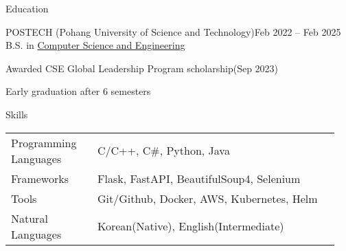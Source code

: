 \documentclass{resume}
\begin{document}
\begin{rSection}{Education}
    \begin{rSubsection}{POSTECH (Pohang University of Science and Technology)}{Feb 2022 -- Feb 2025}
        B.S. in \href{https://cse.postech.ac.kr}{Computer Science and Engineering}

        \item Awarded CSE Global Leadership Program scholarship(Sep 2023)

        \item Early graduation after 6 semesters
    \end{rSubsection}
\end{rSection}

\begin{rSection}{Skills}
    \begin{tabular}{@{}p{0.25\linewidth}p{0.7\linewidth}}
        Programming Languages
            & C/C++, C\#, Python, Java \\ [0.3em]

        Frameworks
            & Flask, FastAPI, BeautifulSoup4, Selenium \\ [0.3em]

        Tools
            & Git/Github, Docker, AWS, Kubernetes, Helm \\ [0.3em]

        Natural Languages
            & Korean(Native), English(Intermediate)
    \end{tabular}
\end{rSection}
\end{document}
